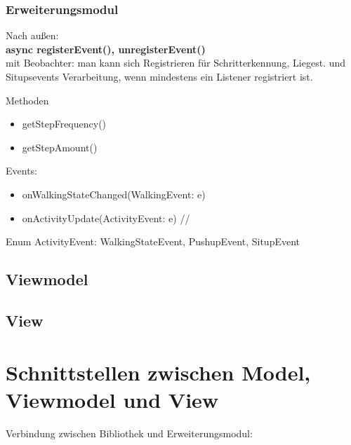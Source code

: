 \documentclass[a4paper,12pt]{article}
\begin{document}
\subsubsection{Erweiterungsmodul}
Nach außen:\\
\textbf{async registerEvent(), unregisterEvent()}\\
mit Beobachter: man kann sich Registrieren für Schritterkennung, Liegest. und Situpsevents
Verarbeitung, wenn mindestens ein Listener registriert ist. 

Methoden
\begin{itemize}
    \item getStepFrequency()
    \item getStepAmount()
\end{itemize}
Events:
\begin{itemize}
    \item onWalkingStateChanged(WalkingEvent: e)
    \item onActivityUpdate(ActivityEvent: e) // 
\end{itemize}
Enum ActivityEvent: WalkingStateEvent, PushupEvent, SitupEvent

\subsection{Viewmodel}

\subsection{View}


\section{Schnittstellen zwischen Model, Viewmodel und View}
Verbindung zwischen Bibliothek und Erweiterungsmodul:
\end{document}
